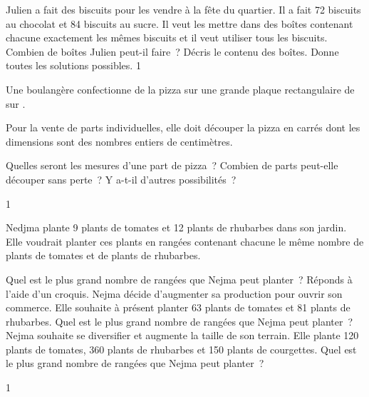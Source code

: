 \documentclass[a4paper,11pt]{report}
\begin{document}
\begin{exo}{ %
    Julien a fait des biscuits pour les vendre à la fête du quartier. Il a fait 72 biscuits au chocolat et 84 biscuits au sucre. Il veut les mettre dans des boîtes contenant chacune exactement les mêmes biscuits et il veut utiliser tous les biscuits. \\
    Combien de boîtes Julien peut-il faire~? Décris le contenu des boîtes.    Donne toutes les solutions possibles.
}{1}\end{exo}



\begin{exo}{
		Une boulangère confectionne de la pizza sur une grande plaque rectangulaire de  sur .

    Pour la vente de parts individuelles, elle doit découper la pizza en carrés dont les dimensions sont des nombres entiers de centimètres. 
    \begin{tasks}
        \task Quelles seront les mesures d'une part de pizza~?
        \task Combien de parts peut-elle découper sans perte~?
        \task Y a-t-il d'autres possibilités~?
    \end{tasks}
}{1}\end{exo}



\begin{exo}{
    Nedjma plante 9 plants de tomates et 12 plants de rhubarbes dans son jardin. \\ Elle voudrait planter ces plants en rangées contenant chacune le même nombre de plants de tomates et de plants de rhubarbes.
    \begin{tasks}
        \task Quel est le plus grand nombre de rangées que Nejma peut planter~? Réponds à l'aide d'un croquis.
        \task Nejma décide d'augmenter sa production pour ouvrir son commerce. Elle souhaite à présent planter 63 plants de tomates et 81 plants de rhubarbes. Quel est le plus grand nombre de rangées que Nejma peut planter~?
        \task Nejma souhaite se diversifier et augmente la taille de son terrain. Elle plante 120 plants de tomates, 360 plants de rhubarbes et 150 plants de courgettes. Quel est le plus grand nombre de rangées que Nejma peut planter~?
    \end{tasks}
}{1}\end{exo}
\end{document}
